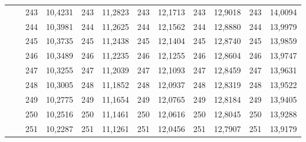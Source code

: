 \documentclass[a4paper,12pt]{article} %
\begin{document}
\begin{longtable}[c]{cccccccccc|c|c|}
	& \multicolumn{1}{c|}{} & \multicolumn{1}{c|}{243} & \multicolumn{1}{c|}{10,4231} & \multicolumn{1}{c|}{243} & \multicolumn{1}{c|}{11,2823} & \multicolumn{1}{c|}{243} & \multicolumn{1}{c|}{12,1713} & \multicolumn{1}{c|}{243} & 12,9018 & 243 & 14,0094 \\ \cline{3-12} 
	& \multicolumn{1}{c|}{} & \multicolumn{1}{c|}{244} & \multicolumn{1}{c|}{10,3981} & \multicolumn{1}{c|}{244} & \multicolumn{1}{c|}{11,2625} & \multicolumn{1}{c|}{244} & \multicolumn{1}{c|}{12,1562} & \multicolumn{1}{c|}{244} & 12,8880 & 244 & 13,9979 \\ \cline{3-12} 
	& \multicolumn{1}{c|}{} & \multicolumn{1}{c|}{245} & \multicolumn{1}{c|}{10,3735} & \multicolumn{1}{c|}{245} & \multicolumn{1}{c|}{11,2438} & \multicolumn{1}{c|}{245} & \multicolumn{1}{c|}{12,1404} & \multicolumn{1}{c|}{245} & 12,8740 & 245 & 13,9859 \\ \cline{3-12} 
	& \multicolumn{1}{c|}{} & \multicolumn{1}{c|}{246} & \multicolumn{1}{c|}{10,3489} & \multicolumn{1}{c|}{246} & \multicolumn{1}{c|}{11,2235} & \multicolumn{1}{c|}{246} & \multicolumn{1}{c|}{12,1255} & \multicolumn{1}{c|}{246} & 12,8604 & 246 & 13,9747 \\ \cline{3-12} 
	& \multicolumn{1}{c|}{} & \multicolumn{1}{c|}{247} & \multicolumn{1}{c|}{10,3255} & \multicolumn{1}{c|}{247} & \multicolumn{1}{c|}{11,2039} & \multicolumn{1}{c|}{247} & \multicolumn{1}{c|}{12,1093} & \multicolumn{1}{c|}{247} & 12,8459 & 247 & 13,9631 \\ \cline{3-12} 
	& \multicolumn{1}{c|}{} & \multicolumn{1}{c|}{248} & \multicolumn{1}{c|}{10,3005} & \multicolumn{1}{c|}{248} & \multicolumn{1}{c|}{11,1852} & \multicolumn{1}{c|}{248} & \multicolumn{1}{c|}{12,0937} & \multicolumn{1}{c|}{248} & 12,8319 & 248 & 13,9522 \\ \cline{3-12} 
	& \multicolumn{1}{c|}{} & \multicolumn{1}{c|}{249} & \multicolumn{1}{c|}{10,2775} & \multicolumn{1}{c|}{249} & \multicolumn{1}{c|}{11,1654} & \multicolumn{1}{c|}{249} & \multicolumn{1}{c|}{12,0765} & \multicolumn{1}{c|}{249} & 12,8184 & 249 & 13,9405 \\ \cline{3-12} 
	& \multicolumn{1}{c|}{} & \multicolumn{1}{c|}{250} & \multicolumn{1}{c|}{10,2516} & \multicolumn{1}{c|}{250} & \multicolumn{1}{c|}{11,1461} & \multicolumn{1}{c|}{250} & \multicolumn{1}{c|}{12,0616} & \multicolumn{1}{c|}{250} & 12,8045 & 250 & 13,9288 \\ \cline{3-12} 
	& \multicolumn{1}{c|}{} & \multicolumn{1}{c|}{251} & \multicolumn{1}{c|}{10,2287} & \multicolumn{1}{c|}{251} & \multicolumn{1}{c|}{11,1261} & \multicolumn{1}{c|}{251} & \multicolumn{1}{c|}{12,0456} & \multicolumn{1}{c|}{251} & 12,7907 & 251 & 13,9179 \\ \cline{3-12} 

\end{longtable}
\end{document}
